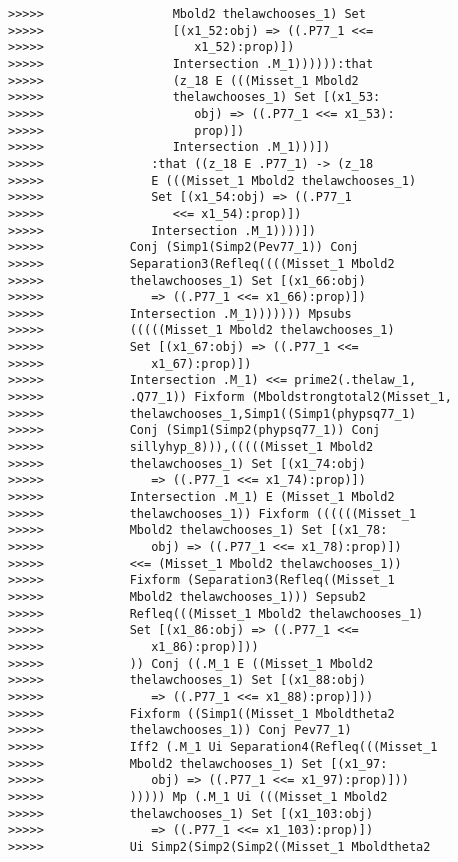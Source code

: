 \documentclass[12pt]{article}
\begin{document}
\begin{verbatim}
>>>>>                  Mbold2 thelawchooses_1) Set
>>>>>                  [(x1_52:obj) => ((.P77_1 <<=
>>>>>                     x1_52):prop)])
>>>>>                  Intersection .M_1)))))):that
>>>>>                  (z_18 E (((Misset_1 Mbold2
>>>>>                  thelawchooses_1) Set [(x1_53:
>>>>>                     obj) => ((.P77_1 <<= x1_53):
>>>>>                     prop)])
>>>>>                  Intersection .M_1)))])
>>>>>               :that ((z_18 E .P77_1) -> (z_18
>>>>>               E (((Misset_1 Mbold2 thelawchooses_1)
>>>>>               Set [(x1_54:obj) => ((.P77_1
>>>>>                  <<= x1_54):prop)])
>>>>>               Intersection .M_1))))])
>>>>>            Conj (Simp1(Simp2(Pev77_1)) Conj
>>>>>            Separation3(Refleq((((Misset_1 Mbold2
>>>>>            thelawchooses_1) Set [(x1_66:obj)
>>>>>               => ((.P77_1 <<= x1_66):prop)])
>>>>>            Intersection .M_1))))))) Mpsubs
>>>>>            (((((Misset_1 Mbold2 thelawchooses_1)
>>>>>            Set [(x1_67:obj) => ((.P77_1 <<=
>>>>>               x1_67):prop)])
>>>>>            Intersection .M_1) <<= prime2(.thelaw_1,
>>>>>            .Q77_1)) Fixform (Mboldstrongtotal2(Misset_1,
>>>>>            thelawchooses_1,Simp1((Simp1(phypsq77_1)
>>>>>            Conj (Simp1(Simp2(phypsq77_1)) Conj
>>>>>            sillyhyp_8))),(((((Misset_1 Mbold2
>>>>>            thelawchooses_1) Set [(x1_74:obj)
>>>>>               => ((.P77_1 <<= x1_74):prop)])
>>>>>            Intersection .M_1) E (Misset_1 Mbold2
>>>>>            thelawchooses_1)) Fixform ((((((Misset_1
>>>>>            Mbold2 thelawchooses_1) Set [(x1_78:
>>>>>               obj) => ((.P77_1 <<= x1_78):prop)])
>>>>>            <<= (Misset_1 Mbold2 thelawchooses_1))
>>>>>            Fixform (Separation3(Refleq((Misset_1
>>>>>            Mbold2 thelawchooses_1))) Sepsub2
>>>>>            Refleq(((Misset_1 Mbold2 thelawchooses_1)
>>>>>            Set [(x1_86:obj) => ((.P77_1 <<=
>>>>>               x1_86):prop)]))
>>>>>            )) Conj ((.M_1 E ((Misset_1 Mbold2
>>>>>            thelawchooses_1) Set [(x1_88:obj)
>>>>>               => ((.P77_1 <<= x1_88):prop)]))
>>>>>            Fixform ((Simp1((Misset_1 Mboldtheta2
>>>>>            thelawchooses_1)) Conj Pev77_1)
>>>>>            Iff2 (.M_1 Ui Separation4(Refleq(((Misset_1
>>>>>            Mbold2 thelawchooses_1) Set [(x1_97:
>>>>>               obj) => ((.P77_1 <<= x1_97):prop)]))
>>>>>            ))))) Mp (.M_1 Ui (((Misset_1 Mbold2
>>>>>            thelawchooses_1) Set [(x1_103:obj)
>>>>>               => ((.P77_1 <<= x1_103):prop)])
>>>>>            Ui Simp2(Simp2(Simp2((Misset_1 Mboldtheta2

\end{verbatim}
\end{document}
